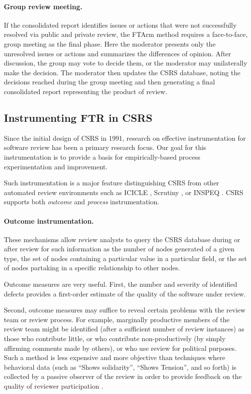 \paragraph {Group review meeting.} If the consolidated report 
identifies issues or actions that were not successfully resolved via
public and private review, the FTArm method requires a face-to-face,
group meeting as the final phase.  Here the moderator presents only
the unresolved issues or actions and summarizes the differences of
opinion.  After discussion, the group may vote to decide them, or the
moderator may unilaterally make the decision. The moderator then
updates the CSRS database, noting the decisions reached during the
group meeting and then generating a final consolidated report
representing the product of review.




\subsection{Instrumenting FTR in CSRS}
\label{sec:instrumentation}

Since the initial design of CSRS in 1991, research on effective
instrumentation for software review has been a primary research focus.  Our
goal for this instrumentation is to provide a basis for empirically-based
process experimentation and improvement.

Such instrumentation is a major feature distinguishing CSRS from other
automated review environments such as ICICLE \cite{Brothers90}, Scrutiny
\cite{Gintell93}, or INSPEQ \cite{Knight91}.  CSRS supports both {\em
outcome} and {\em process} instrumentation.

\paragraph{Outcome instrumentation.} 

These mechanisms allow review analysts to query the CSRS database
during or after review for such information as the number of nodes
generated of a given type, the set of nodes containing a particular
value in a particular field, or the set of nodes partaking in a
specific relationship to other nodes.

Outcome measures are very useful. First, the number and severity
of identified defects provides a first-order estimate of the quality of the
software under review.

Second, outcome measures may suffice to reveal certain problems
with the review team or review process.  For example, marginally productive
members of the review team might be identified (after a sufficient number
of review instances) as those who contribute little, or who contribute
non-productively (by simply affirming comments made by others), or who use
review for political purposes.  Such a method is less expensive and more
objective than techniques where behavioral data (such as ``Shows
solidarity'', ``Shows Tension'', and so forth) is collected by a passive
observer of the review in order to provide feedback on the quality of
reviewer participation \cite{Freedman90}.

